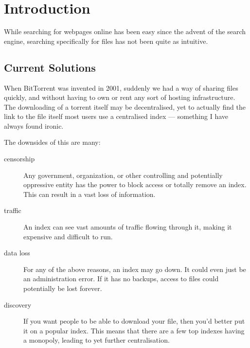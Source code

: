 \section{Introduction}
	While searching for webpages online has been easy since the advent of
	the search engine, searching specifically for files has not been quite
	as intuitive.
\subsection{Current Solutions}
	\begin{multicols}{2}
		When BitTorrent \cite{bittorrent} was invented in 2001, suddenly we had a way of sharing
		files quickly, and without having to own or rent any sort of hosting
		infrastructure. The downloading of a torrent itself may be
		decentralised, yet to actually find the link to the file itself most
		users use a centralised index --- something I have always found ironic.

		The downsides of this are many:

		\begin{description}
			\item[censorship]
				Any government, organization, or other controlling and
				potentially oppressive entity has the power to block access or
				totally remove an index. This can result in a vast loss of
				information.
			\item[traffic]
				An index can see vast amounts of traffic flowing
				through it, making it expensive and difficult to run.
			\item[data loss]
				For any of the above reasons, an index may go down. It could
				even just be an administration error. If it has no backups,
				access to files could potentially be lost forever.
			\item[discovery] If you want people to be able to download your
				file, then you'd better put it on a popular index. This means
				that there are a few top indexes having a monopoly, leading to
				yet further centralisation.

	
		\end{description}
	\end{multicols}
